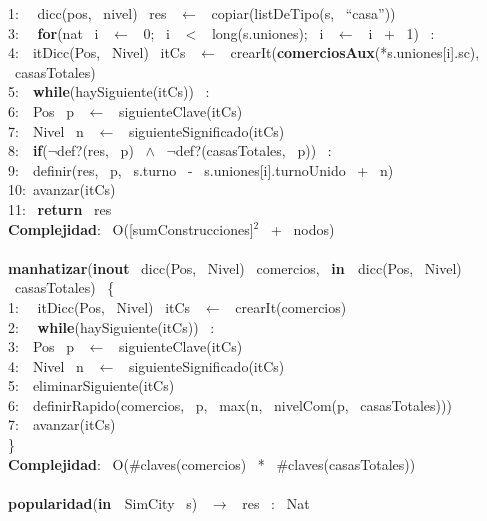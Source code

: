 \begin{Algoritmos}
1: \  \ dicc(pos, \ nivel) \ res \ $\leftarrow$ \ copiar(listDeTipo(s, \ ``casa''))\\
3: \  \ \textbf{for}(nat \ i \ $\leftarrow$ \ 0; \ i \ $<$ \ long(s.uniones); \ i \ $\leftarrow$ \ i \ + \ 1) \ : \ \\
4:\indent  \  \ itDicc(Pos, \ Nivel) \ itCs \ $\leftarrow$ \ crearIt(\textbf{comerciosAux}(*s.uniones[i].sc), \ casasTotales)\\
5:\indent  \  \ \textbf{while}(haySiguiente(itCs)) \ :\\
6:\indent \indent  \  \ Pos \ p \ $\leftarrow$ \ siguienteClave(itCs)\\
7:\indent \indent  \  \ Nivel \ n \ $\leftarrow$ \ siguienteSignificado(itCs)\\
8:\indent \indent  \  \ \textbf{if}($\neg$def?(res, \ p) \ $\wedge$ \ $\neg$def?(casasTotales, \ p)) \ :\\
9:\indent \indent \indent  \  \ definir(res, \ p, \ s.turno \ - \ s.uniones[i].turnoUnido \ + \ n)\\
10:\indent \indent  \ avanzar(itCs)\\
11: \ \textbf{return} \ res\\
\textbf{Complejidad}: \ O([sumConstrucciones]$^2$ \ + \ nodos)\\
\\
\textbf{manhatizar}(\textbf{inout} \ dicc(Pos, \ Nivel) \ comercios, \ \textbf{in \ }dicc(Pos, \ Nivel) \ casasTotales) \ \{\\
1: \  \ itDicc(Pos, \ Nivel) \ itCs \ $\leftarrow$ \ crearIt(comercios)\\
2: \  \ \textbf{while}(haySiguiente(itCs)) \ :\\
3:\indent  \  \ Pos \ p \ $\leftarrow$ \ siguienteClave(itCs)\\
4:\indent  \  \ Nivel \ n \ $\leftarrow$ \ siguienteSignificado(itCs)\\
5:\indent  \  \ eliminarSiguiente(itCs)\\
6:\indent  \  \ definirRapido(comercios, \ p, \ max(n, \ nivelCom(p, \ casasTotales)))\\
7:\indent  \  \ avanzar(itCs)\\
\}\\
\textbf{Complejidad}: \ O($ \# $claves(comercios) \ * \ $ \# $claves(casasTotales))\\
\makebox[\linewidth]{\rule{\textwidth}{0.4pt}}
\\
\makebox[\linewidth]{\rule{\textwidth}{0.4pt}}
\textbf{popularidad}(\textbf{in \ }SimCity \ s) \ $\rightarrow $ \ res \ : \ Nat\\

\end{Algoritmos}

